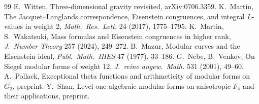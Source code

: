 \documentclass[11pt]{amsart}
\theoremstyle{definition}
\begin{document}
\begin{thebibliography}{99}
 E.~Witten, Three-dimensional gravity revisited, arXiv:0706.3359.
 K.~Martin, The Jacquet--Langlands correspondence, Eisenstein congruences, and integral $L$-values in weight 2, \emph{Math.\ Res.\ Lett.} 24 (2017), 1775--1795.
 K.~Martin, S.~Wakatsuki, Mass formulas and Eisenstein congruences in higher rank, \emph{J.\ Number Theory} 257 (2024), 249--272.
 B.~Mazur, Modular curves and the Eisenstein ideal, \emph{Publ.\ Math.\ IHES} 47 (1977), 33--186.
 G.~Nebe, B.~Venkov, On Siegel modular forms of weight 12, \emph{J.\ reine angew.\ Math.} 531 (2001), 49--60.
 A.~Pollack, Exceptional theta functions and arithmeticity of modular forms on $G_2$, preprint.
 Y.~Shan, Level one algebraic modular forms on anisotropic $F_4$ and their applications, preprint.
\end{thebibliography}
\end{document}
